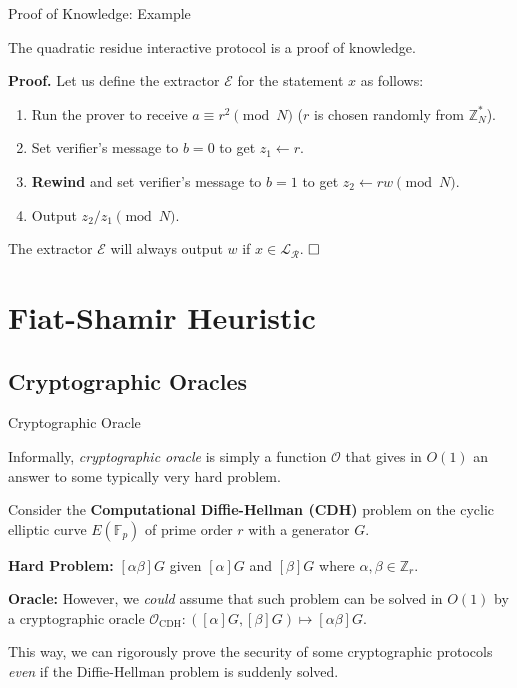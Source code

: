 \documentclass{zkdl-presentation-template}
\begin{document}
    \begin{frame}{Proof of Knowledge: Example}
        \begin{lemma}
            The quadratic residue interactive protocol is a proof of knowledge.\pause
        \end{lemma}
        
        \textbf{Proof.} Let us define the extractor $\mathcal{E}$ for the statement $x$ as follows:
        \begin{enumerate}
            \item Run the prover to receive $a \equiv r^2 \pmod{N}$ ($r$ is chosen randomly from $\mathbb{Z}_N^*$).\pause
            \item Set verifier's message to $b=0$ to get $z_1 \gets r$.\pause
            \item \textbf{Rewind} and set verifier's message to $b=1$ to get $z_2 \gets rw \pmod{N}$.\pause
            \item Output $z_2/z_1 \pmod{N}$. \pause
        \end{enumerate}
        
        The extractor $\mathcal{E}$ will always output $w$ if $x \in \mathcal{L}_{\mathcal{R}}$. $\hfill\Box$
    \end{frame}

    \section{Fiat-Shamir Heuristic}
    \subsection{Cryptographic Oracles}
    \begin{frame}{Cryptographic Oracle}
        \begin{definition}
            Informally, \textit{cryptographic oracle} is simply a function $\mathcal{O}$ that gives in $O(1)$ an answer to some typically very hard problem. \pause  
        \end{definition}
        
        \begin{example}
            Consider the \textbf{Computational Diffie-Hellman (CDH)} problem on the cyclic elliptic curve $E(\mathbb{F}_p)$ of prime order $r$ with a generator $G$. \pause
            
            \textbf{Hard Problem:} $[\alpha\beta]G$ given $[\alpha]G$ and $[\beta]G$ where $\alpha,\beta \in \mathbb{Z}_r$. \pause
        
            \textbf{Oracle:} However, we \textit{could} assume that such problem can be solved in $O(1)$ by a cryptographic oracle $\mathcal{O}_{\text{CDH}}: ([\alpha]G,[\beta]G) \mapsto [\alpha\beta]G$. \pause
            
            This way, we can rigorously prove the security of some cryptographic protocols \textit{even} if the Diffie-Hellman problem is suddenly solved. 
        \end{example}
    \end{frame}
\end{document}
